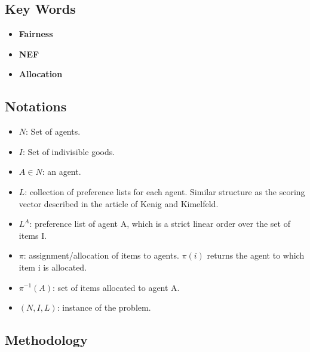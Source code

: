 \documentclass[12pt,a4paper]{article}
\begin{document}
\subsection*{Key Words}
\begin{itemize}
    \item \textbf{Fairness}
    \item \textbf{NEF}
    \item \textbf{Allocation}
\end{itemize}

\subsection*{Notations}

\begin{itemize}
    \item $N$: Set of agents.
    \item $I$: Set of indivisible goods.
    \item $A \in N$: an agent.
    \item $L$: collection of preference lists for each agent. Similar structure as the scoring vector described in the article of Kenig and Kimelfeld.
    \item $L^{A}$: preference list of agent A, which is a strict linear order over the set of items I.
    \item $\pi$: assignment/allocation of items to agents. $\pi(i)$ returns the agent to which item i is allocated.
    \item $\pi^{-1}(A)$: set of items allocated to agent A.
    \item $(N,I,L)$: instance of the problem.
\end{itemize}

\subsection*{Methodology}
\end{document}

